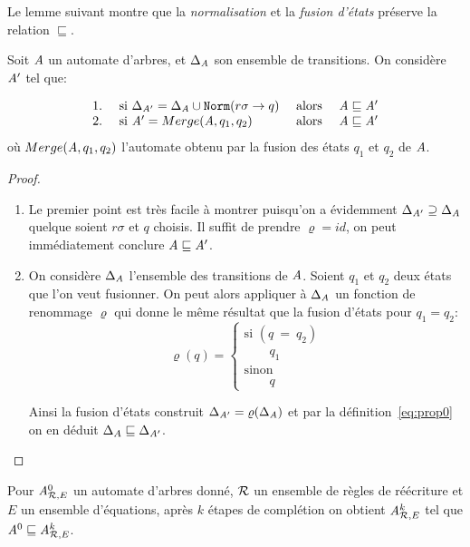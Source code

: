 Le lemme suivant montre que la \emph{normalisation} et la \emph{fusion
  d'états} préserve la relation $\sqsubseteq$.

\begin{lemma}
  Soit $\mathit A$ un automate d'arbres, et $\Delta_\mathit A$ son ensemble de transitions. 
  On considère $\mathit A'$ tel que:
  
  \[
  \begin{array}{llll}
    1. & \mbox{ si } \Delta_{\mathit A'} = \Delta_\mathit A \cup \mathtt{Norm}(r\sigma \rightarrow q) & \mbox{ alors } &\mathit A \sqsubseteq \mathit A' \\
    2. & \mbox{ si } \mathit A' = Merge(\mathit A, q_1, q_2) &\mbox{ alors }& \mathit A \sqsubseteq \mathit A'  \\
  \end{array}
  \]
  où $Merge(\mathit A,q_1,q_2)$ l'automate obtenu par la fusion des états $q_1$ et $q_2$ de $\mathit A$.
\end{lemma}

\begin{proof}

  \begin{enumerate}
  \item Le premier point est très facile à montrer puisqu'on a évidemment $\Delta_{\mathit A'} \supseteq
    \Delta_\mathit A$ quelque soient $r\sigma$ et $q$ choisis.
    Il suffit de prendre $\varrho = id$, on peut immédiatement conclure $\mathit A
    \sqsubseteq \mathit A'$.

  \item On considère $\Delta_\mathit A$ l'ensemble des transitions de $\mathit A$. Soient $q_1$ et $q_2$ deux états
    que l'on veut fusionner.  On peut alors appliquer à $\Delta_\mathit A$ un fonction de renommage $\varrho$ qui donne le même 
    résultat que la fusion d'états pour $q_1 = q_2$:
    \[
    \varrho(q) = \left\{
      \begin{array}{l}
        \textrm{si }(q\ =\ q_2)\\
        \quad \quad q_1\\
        \textrm{sinon}\\
        \quad \quad q
      \end{array}\right.
    \]
    
    Ainsi la fusion d'états construit $\Delta_{\mathit A'} = \varrho(\Delta_\mathit A)$ et par 
    la définition~\ref{eq:prop0} on en déduit $\Delta_A \sqsubseteq \Delta_{\mathit A'}$.
  \end{enumerate}
\end{proof}


\begin{theorem}
  Pour ${\mathit A}_{\mathcal R,E}^0$ un automate d'arbres donné, $\mathcal R$ un ensemble de règles de réécriture
  et $E$ un ensemble d'équations, après $k$ étapes de complétion on obtient 
  ${\mathit A}_{\mathcal R,E}^k$ tel que  $\mathit A^0 \sqsubseteq {\mathit A}_{\mathcal R,E}^k$.
\end{theorem}

